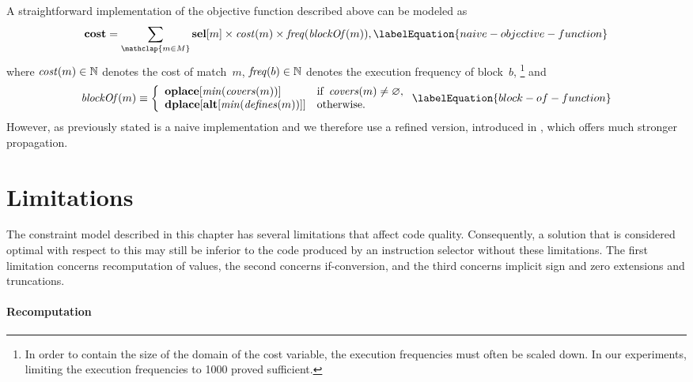 A straightforward implementation of the \gls{objective function} described above
can be modeled as
%
\begin{equation}
  \mVar{cost} =
  \sum_{\mathclap{m \in \mMatchSet}}
  \mVar{sel}[m] \times \mCost(m) \times \mFreq(\mBlockOf(m)),
  \labelEquation{naive-objective-function}
\end{equation}
%
where \mbox{$\operatorname{\textrm{\textit{cost}}}(m) \in \mathbb{N}$} denotes the cost of \gls{match}~$m$,
\mbox{$\operatorname{\textrm{\textit{freq}}}(b) \in \mathbb{N}$} denotes the execution frequency of
block~$b$\!,\hspace{-1pt}%
%
\footnote{%
  In order to contain the size of the \gls{domain} of the \gls{cost variable},
  the execution frequencies must often be scaled down.
  In our experiments, limiting the execution frequencies to \num{1000} proved
  sufficient.
}
%
and
%
\begin{equation}
  \mBlockOf(m)
  \equiv
  \left\{
  \begin{array}{ll}
      \mVar{oplace}[\mMin(\mCovers(m))]
    & \text{if } \mCovers(m) \neq \mEmptySet, \\
      \mVar{dplace}[\mVar{alt}[\mMin(\mDefines(m))]]
    & \text{otherwise}.
  \end{array}
  \right.
  \labelEquation{block-of-function}
\end{equation}
%
However, as previously stated  is a naive
implementation and we therefore use a refined version, introduced in
, which offers much stronger \gls{propagation}.


\section{Limitations}

The \gls{constraint model} described in this chapter has several limitations
that affect code quality.
%
Consequently, a \gls{solution} that is considered optimal with respect to this
 may still be inferior to the code produced by an
\gls{instruction selector} without these limitations.
%
The first limitation concerns \gls{recomputation} of values, the second concerns
\gls{if-conversion}, and the third concerns implicit sign and zero extensions
and truncations.


\paragraph{Recomputation}

